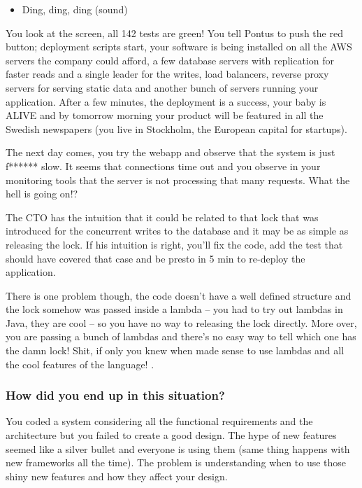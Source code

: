 \documentclass[]{article}
\providecommand{\tightlist}{%
  \setlength{\itemsep}{0pt}\setlength{\parskip}{0pt}}
\begin{document}
\begin{itemize}
\tightlist
\item
  Ding, ding, ding (sound)
\end{itemize}

You look at the screen, all 142 tests are green! You tell Pontus to push
the red button; deployment scripts start, your software is being
installed on all the AWS servers the company could afford, a few
database servers with replication for faster reads and a single leader
for the writes, load balancers, reverse proxy servers for serving static
data and another bunch of servers running your application. After a few
minutes, the deployment is a success, your baby is ALIVE and by tomorrow
morning your product will be featured in all the Swedish newspapers (you
live in Stockholm, the European capital for startups).

The next day comes, you try the webapp and observe that the system is
just f****** slow. It seems that connections time out and you observe in
your monitoring tools that the server is not processing that many
requests. What the hell is going on!?

The CTO has the intuition that it could be related to that lock that was
introduced for the concurrent writes to the database and it may be as
simple as releasing the lock. If his intuition is right, you'll fix the
code, add the test that should have covered that case and be presto in 5
min to re-deploy the application.

There is one problem though, the code doesn't have a well defined
structure and the lock somehow was passed inside a lambda -- you had to
try out lambdas in Java, they are cool -- so you have no way to
releasing the lock directly. More over, you are passing a bunch of
lambdas and there's no easy way to tell which one has the damn lock!
Shit, if only you knew when made sense to use lambdas and all the cool
features of the language! .

\subsubsection{How did you end up in this
situation?}\label{how-did-you-end-up-in-this-situation}

You coded a system considering all the functional requirements and the
architecture but you failed to create a good design. The hype of new
features seemed like a silver bullet and everyone is using them (same
thing happens with new frameworks all the time). The problem is
understanding when to use those shiny new features and how they affect
your design.
\end{document}
